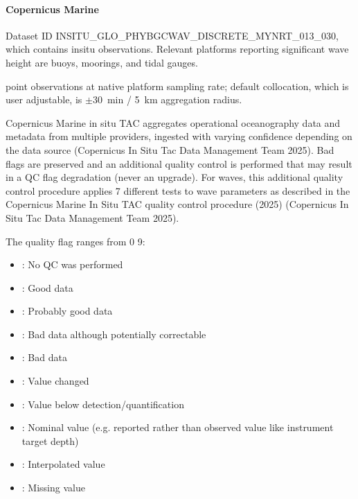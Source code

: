 \documentclass[a4paper,10pt,english]{sphinxmanual}
\begin{document}
\paragraph{Copernicus Marine}
\label{\detokenize{05_reference_datasets:subpar-cmems-insitu-waves}}\label{\detokenize{05_reference_datasets:id4}}
\sphinxAtStartPar
{}

\sphinxAtStartPar
Dataset ID INSITU\_GLO\_PHYBGCWAV\_DISCRETE\_MYNRT\_013\_030, which contains in\sphinxhyphen{}situ observations. Relevant platforms reporting significant wave height are buoys, moorings, and tidal gauges.

\sphinxAtStartPar
{}

\sphinxAtStartPar
point observations at native platform sampling rate; default collocation, which is user adjustable, is \(\pm\)30 min / 5 km aggregation radius.

\sphinxAtStartPar
{}

\sphinxAtStartPar
Copernicus Marine in situ TAC aggregates operational oceanography data and metadata from multiple providers, ingested with varying confidence depending on the data source (Copernicus In Situ Tac Data Management Team 2025). Bad flags are preserved and an additional quality control is performed that may result in a QC flag degradation (never an upgrade). For waves, this additional quality control procedure applies 7 different tests to wave parameters as described in the Copernicus Marine In Situ TAC quality control procedure (2025) (Copernicus In Situ Tac Data Management Team 2025).

\sphinxAtStartPar
The quality flag ranges from 0 \textendash{} 9:
\begin{itemize}
\item {} 
: No QC was performed

\item {} 
: Good data

\item {} 
: Probably good data

\item {} 
: Bad data although potentially correctable

\item {} 
: Bad data

\item {} 
: Value changed

\item {} 
: Value below detection/quantification

\item {} 
: Nominal value (e.g. reported rather than observed value like instrument target depth)

\item {} 
: Interpolated value

\item {} 
: Missing value

\end{itemize}
\end{document}
